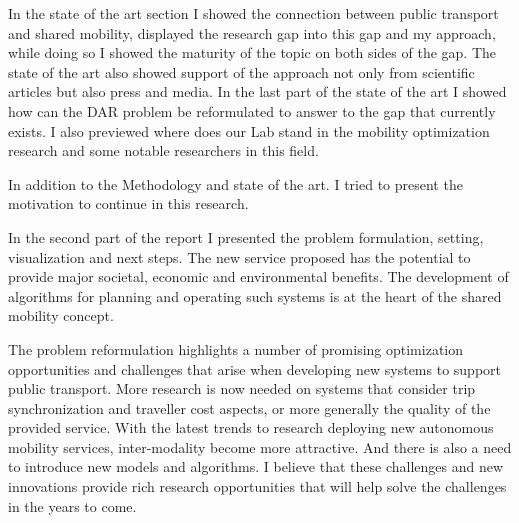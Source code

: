 \documentclass{article}
\begin{document}
In the state of the art section I showed the connection between public transport and shared mobility, displayed the research gap into this gap and my approach, while doing so I showed the maturity of the topic on both sides of the gap. The state of the art also showed support of the approach not only from scientific articles but also press and media. In the last part of the state of the art I showed how can the DAR problem be reformulated to answer to the gap that currently exists. I also previewed where does our Lab stand in the mobility optimization research and some notable researchers in this field.

In addition to the Methodology and state of the art. I tried to present the motivation to continue in this research. 

In the second part of the report I presented the problem formulation, setting, visualization and next steps.  The new service proposed has the potential to provide major societal, economic and environmental benefits. The development of algorithms for planning and
operating such systems is at the heart of the shared mobility concept. 


The problem reformulation highlights a number of promising optimization opportunities and challenges that arise when developing new systems to support public transport.
More research is now needed on systems that consider trip synchronization and traveller cost aspects, or more generally the quality of the provided service. With the latest trends to research deploying new autonomous mobility services, inter-modality become more attractive. And there is also a need to introduce new models and algorithms.
I believe that these challenges and new innovations provide rich research opportunities that will help solve the challenges in the years to come. %
\newpage


\end{document}

